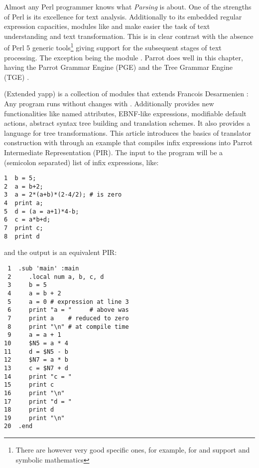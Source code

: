 Almost any Perl programmer knows what {\it Parsing} is about.
One of the strengths of Perl is its excellence for text analysis. 
Additionally to its embedded regular expression capacities, modules 
like  \cite{conwayrd} and 
 \cite{desarmenien} make easier the task of text 
understanding and text transformation.
This is in clear contrast with the absence of Perl 5 
generic tools\footnote{There are however very good specific ones,
for example, for  and  support and 
symbolic mathematics
}
giving support for the subsequent stages
of text processing.
The exception being the module 
\cite{luke}. Parrot does well in this 
chapter, having the Parrot Grammar Engine (PGE) \cite{michaud}
and the Tree Grammar Engine (TGE)
\cite{randaltge}.

 (Extended yapp) is a collection of modules
that extends Francois Desarmenien  :
Any  program runs without changes with .
Additionally  provides new 
functionalities like named attributes,
EBNF-like expressions, modifiable default actions,
abstract syntax tree building and translation schemes. 
It also provides a language for tree transformations.
This article introduces the basics of 
translator construction with  through an
example that compiles infix expressions into Parrot 
Intermediate Representation (PIR)\cite{randal04}.
The input to the program will be a (semicolon separated)
list of infix expressions, like:

\begin{verbatim}
1  b = 5;
2  a = b+2;
3  a = 2*(a+b)*(2-4/2); # is zero
4  print a;
5  d = (a = a+1)*4-b;
6  c = a*b+d;
7  print c;
8  print d
\end{verbatim}

and the output is an equivalent
PIR: 
\begin{verbatim}
 1  .sub 'main' :main
 2     .local num a, b, c, d
 3     b = 5
 4     a = b + 2
 5     a = 0 # expression at line 3 
 6     print "a = "     # above was
 7     print a    # reduced to zero
 8     print "\n" # at compile time
 9     a = a + 1
10     $N5 = a * 4
11     d = $N5 - b
12     $N7 = a * b
13     c = $N7 + d
14     print "c = "
15     print c
16     print "\n"
17     print "d = "
18     print d
19     print "\n"
20  .end
\end{verbatim}

